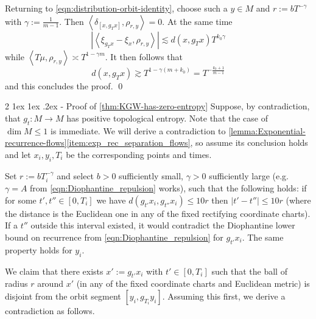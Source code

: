 \documentclass[11pt]{amsart}
\makeatletter
\renewcommand{\subsection}
{\@startsection{subsection}
				     {2}
				     {\z@}%
                     {-3.25ex\@plus -1ex \@minus -.2ex}%
                     {1.5ex \@plus .2ex}%
                     {\normalfont \large \bfseries \sffamily}}%
\newcommand{\ip}[1]{\left\langle#1\right\rangle}
\newcommand{\leqapprox}{\lesssim}
\newcommand{\geqapprox}{\gtrsim}
\theoremstyle{mytheoremstyle}
\theoremstyle{mydefinitionstyle}
\theoremstyle{mytheoremstyle}
\numberwithin{equation}{section}
\renewcommand{\subsection}
{\@startsection{subsection}
                     {2}
                     {\z@}%
                     {1ex \@plus1ex \@minus.2ex}%
                     {-\fontdimen 2\font }
                     {\normalfont\normalsize\bfseries}}
\theoremstyle{mydefinitionstyle}
\makeatother
\begin{document}
Returning to \autoref{eqn:distribution-orbit-identity}, choose such a $y\in M$ and $r:={b}T^{-\gamma}$ with $\gamma:=\tfrac{1}{m-1}$.
Then $\ip{\delta_{[x,g_Tx]},\rho_{r,y}}=0$.
At the same time
\[
	|\ip{\xi_{g_T x} - \xi_x,\rho_{r,y}}|\leqapprox d(x,g_Tx) T^{k_0\gamma}
\]
while $\ip{T\mu,\rho_{r,y}}\asymp T^{1-\gamma m}$.
It then follows that
\[
	d(x,g_Tx)\geqapprox T^{1-\gamma(m+k_0)} = T^{-\tfrac{k_0+1}{m-1}}
\]
and this concludes the proof. \hfill \qed




\subsection{Proof of \autoref{thm:KGW-has-zero-entropy}}
	\label{ssec:proof_of_zero_entropy}
Suppose, by contradiction, that $g_t\colon M\to M$ has positive topological entropy.
Note that the case of $\dim M\leq 1$ is immediate.
We will derive a contradiction to \autoref{lemma:Exponential-recurrence-flows}\autoref{item:exp_rec_separation_flows}, so assume its conclusion holds and let $x_i,y_i, T_i$ be the corresponding points and times.


Set $r:=bT_i^{-\gamma}$ and select $b>0$ sufficiently small, $\gamma>0$ sufficiently large (e.g. $\gamma=A$ from \autoref{eqn:Diophantine_repulsion} works), such that the following holds: if for some $t',t''\in[0,T_i]$ we have $d(g_{t'}x_i,g_{t''}x_i)\leq 10r$ then $|t'-t''|\leq 10r$ (where the distance is the Euclidean one in any of the fixed rectifying coordinate charts).
If a $t''$ outside this interval existed, it would contradict the Diophantine lower bound on recurrence from \autoref{eqn:Diophantine_repulsion} for $g_{t'}x_i$.
The same property holds for $y_{i}$.

We claim that there exists $x':=g_{t'}x_i$ with $t'\in [0, T_i]$ such that the ball of radius $r$ around $x'$ (in any of the fixed coordinate charts and Euclidean metric) is disjoint from the orbit segment $[y_i,g_{T_i}y_i]$.
Assuming this first, we derive a contradiction as follows.
\end{document}
